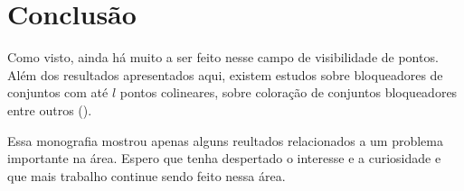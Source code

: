 \chapter {Conclusão}
Como visto, ainda há muito a ser feito nesse campo de visibilidade de pontos. Além dos resultados apresentados aqui, existem estudos sobre bloqueadores de conjuntos com até $l$ pontos colineares, sobre coloração de conjuntos bloqueadores entre outros (\cite{visblock}).

Essa monografia mostrou apenas alguns reultados relacionados a um problema importante na área. Espero que tenha despertado o interesse e a curiosidade e que mais trabalho continue sendo feito nessa área.

